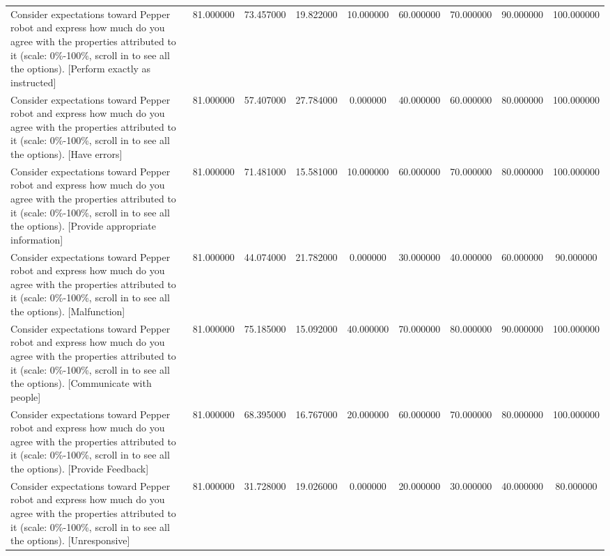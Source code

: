 \begin{table}[htbp]
\begin{tabular}{lcccccccc}
Consider expectations toward Pepper robot and express how much do you agree with the properties attributed to it (scale: 0\%-100\%, scroll in to see all the options).  [Perform exactly as instructed] & 81.000000 & 73.457000 & 19.822000 & 10.000000 & 60.000000 & 70.000000 & 90.000000 & 100.000000 \\
Consider expectations toward Pepper robot and express how much do you agree with the properties attributed to it (scale: 0\%-100\%, scroll in to see all the options).  [Have errors] & 81.000000 & 57.407000 & 27.784000 & 0.000000 & 40.000000 & 60.000000 & 80.000000 & 100.000000 \\
Consider expectations toward Pepper robot and express how much do you agree with the properties attributed to it (scale: 0\%-100\%, scroll in to see all the options).  [Provide appropriate information] & 81.000000 & 71.481000 & 15.581000 & 10.000000 & 60.000000 & 70.000000 & 80.000000 & 100.000000 \\
Consider expectations toward Pepper robot and express how much do you agree with the properties attributed to it (scale: 0\%-100\%, scroll in to see all the options).  [Malfunction] & 81.000000 & 44.074000 & 21.782000 & 0.000000 & 30.000000 & 40.000000 & 60.000000 & 90.000000 \\
Consider expectations toward Pepper robot and express how much do you agree with the properties attributed to it (scale: 0\%-100\%, scroll in to see all the options).  [Communicate with people] & 81.000000 & 75.185000 & 15.092000 & 40.000000 & 70.000000 & 80.000000 & 90.000000 & 100.000000 \\
Consider expectations toward Pepper robot and express how much do you agree with the properties attributed to it (scale: 0\%-100\%, scroll in to see all the options).  [Provide Feedback] & 81.000000 & 68.395000 & 16.767000 & 20.000000 & 60.000000 & 70.000000 & 80.000000 & 100.000000 \\
Consider expectations toward Pepper robot and express how much do you agree with the properties attributed to it (scale: 0\%-100\%, scroll in to see all the options).  [Unresponsive] & 81.000000 & 31.728000 & 19.026000 & 0.000000 & 20.000000 & 30.000000 & 40.000000 & 80.000000 \\
\bottomrule
\end{tabular}
\end{table}
